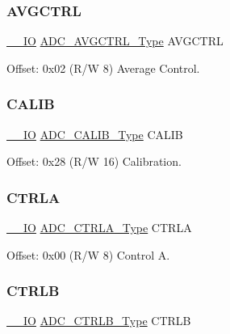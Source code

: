 \subsubsection{\texorpdfstring{AVGCTRL}{AVGCTRL}}
{\footnotesize\ttfamily \mbox{\hyperlink{core__cm0plus_8h_aec43007d9998a0a0e01faede4133d6be}{\+\_\+\+\_\+\+IO}} \mbox{\hyperlink{union_a_d_c___a_v_g_c_t_r_l___type}{A\+D\+C\+\_\+\+A\+V\+G\+C\+T\+R\+L\+\_\+\+Type}} A\+V\+G\+C\+T\+RL}



Offset\+: 0x02 (R/W 8) Average Control. 

\mbox{\label{struct_adc_a6f3a9c186f781d5807f77cf20bf392fb}} 
\subsubsection{\texorpdfstring{CALIB}{CALIB}}
{\footnotesize\ttfamily \mbox{\hyperlink{core__cm0plus_8h_aec43007d9998a0a0e01faede4133d6be}{\+\_\+\+\_\+\+IO}} \mbox{\hyperlink{union_a_d_c___c_a_l_i_b___type}{A\+D\+C\+\_\+\+C\+A\+L\+I\+B\+\_\+\+Type}} C\+A\+L\+IB}



Offset\+: 0x28 (R/W 16) Calibration. 

\mbox{\label{struct_adc_aedbf581af41a7981837f2d6f95ceee4c}} 
\subsubsection{\texorpdfstring{CTRLA}{CTRLA}}
{\footnotesize\ttfamily \mbox{\hyperlink{core__cm0plus_8h_aec43007d9998a0a0e01faede4133d6be}{\+\_\+\+\_\+\+IO}} \mbox{\hyperlink{union_a_d_c___c_t_r_l_a___type}{A\+D\+C\+\_\+\+C\+T\+R\+L\+A\+\_\+\+Type}} C\+T\+R\+LA}



Offset\+: 0x00 (R/W 8) Control A. 

\mbox{\label{struct_adc_ab3298e405dd12dec99aee4f03244f33d}} 
\subsubsection{\texorpdfstring{CTRLB}{CTRLB}}
{\footnotesize\ttfamily \mbox{\hyperlink{core__cm0plus_8h_aec43007d9998a0a0e01faede4133d6be}{\+\_\+\+\_\+\+IO}} \mbox{\hyperlink{union_a_d_c___c_t_r_l_b___type}{A\+D\+C\+\_\+\+C\+T\+R\+L\+B\+\_\+\+Type}} C\+T\+R\+LB}



